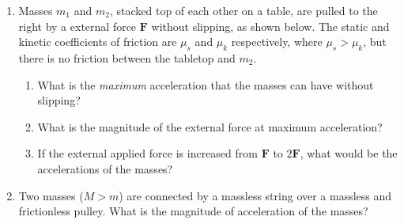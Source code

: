 \documentclass{../../../oss-handout}
\begin{document}
\begin{enumerate}[leftmargin=12pt]
\item Masses $m_1$ and $m_2$, stacked top of each other on a table, are pulled
  to the right by a external force $\mathbf F$ without slipping, as shown
  below. The static and kinetic coefficients of friction are $\mu_s$ and
  $\mu_k$ respectively, where $\mu_s>\mu_k$, but there is no friction between
  the tabletop and $m_2$.
  \begin{center}
  \end{center}
  \begin{enumerate}[nosep]
  \item What is the \emph{maximum} acceleration that the masses can have without
    slipping?
  \item What is the magnitude of the external force at maximum acceleration?
  \item If the external applied force is increased from $\mathbf F$ to
    $2\mathbf F$, what would be the accelerations of the masses?
  \end{enumerate}
  \newpage

\item Two masses ($M>m$) are connected by a massless string over a massless and
  frictionless pulley. What is the magnitude of acceleration of the masses?
  \begin{center}
  \end{center}
  \newpage


\end{enumerate}
\end{document}
